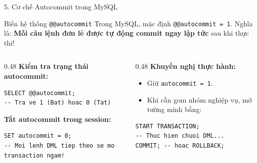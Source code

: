 \documentclass[aspectratio=169,11pt]{beamer}
\newcommand{\code}[1]{\texttt{#1}}
\begin{document}
\begin{frame}[fragile]{5. Cơ chế Autocommit trong MySQL}
  \begin{block}{Biến hệ thống \code{@@autocommit}}
    Trong MySQL, mặc định \code{@@autocommit = 1}. Nghĩa là: \textbf{Mỗi câu lệnh đơn lẻ được tự động commit ngay lập tức} sau khi thực thi!
  \end{block}
  \vspace{0.4em}
  \begin{columns}[T]
    \begin{column}{0.48\textwidth}
      \textbf{Kiểm tra trạng thái autocommit:}
\begin{lstlisting}
SELECT @@autocommit;
-- Tra ve 1 (Bat) hoac 0 (Tat)
\end{lstlisting}
      \textbf{Tắt autocommit trong session:}
\begin{lstlisting}
SET autocommit = 0;
-- Moi lenh DML tiep theo se mo transaction ngam!
\end{lstlisting}
    \end{column}
    \begin{column}{0.48\textwidth}
      \textbf{Khuyến nghị thực hành:}
      \begin{itemize}
        \item Giữ \code{autocommit = 1}.
        \item Khi cần gom nhóm nghiệp vụ, mở tường minh bằng:
      \end{itemize}
\begin{lstlisting}
START TRANSACTION;
-- Thuc hien chuoi DML...
COMMIT; -- hoac ROLLBACK;
\end{lstlisting}
    \end{column}
  \end{columns}
\end{frame}
\end{document}
